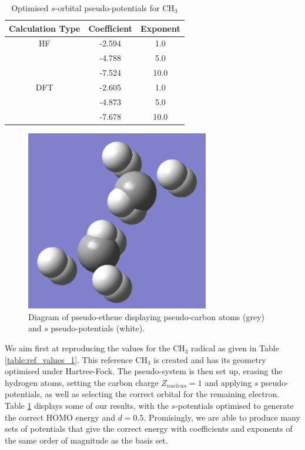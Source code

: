 \documentclass[journal=jctcce,manuscript=article]{achemso}
\begin{document}
\begin{table}[ht]
\caption{Optimised \(s\)-orbital pseudo-potentials for CH\(_{3}\)}
\begin{tabular}{c c c}
\hline\hline
Calculation Type & Coefficient & Exponent \\ [0.5ex]
\hline
HF & -2.594 & 1.0 \\
 & -4.788 & 5.0 \\
 & -7.524 & 10.0 \\
\hline
DFT & -2.605 & 1.0 \\
 & -4.873 & 5.0 \\
 & -7.678 & 10.0 \\
\hline
\end{tabular}
\label{table:ch3_s_potentials}
\end{table}

\begin{figure}
\includegraphics[width=8cm]{long_r_ethene_diagram.png}
\caption{Diagram of pseudo-ethene displaying pseudo-carbon atoms (grey) and \(s\) pseudo-potentials (white).}
\label{fig:long_r_ethene}
\end{figure}

We aim first at reproducing the values for the CH\(_{3}\) radical as given in Table \ref{table:ref_values_1}. This reference CH\(_{3}\) is created and has its geometry optimised under Hartree-Fock. The pseudo-system is then set up, erasing the hydrogen atoms, setting the carbon charge \(Z_{nucleus} = 1\) and applying \(s\) pseudo-potentials, as well as selecting the correct orbital for the remaining electron. Table \ref{table:ch3_s_potentials} displays some of our results, with the \(s\)-potentials optimised to generate the correct HOMO energy and \(d = 0.5\). Promisingly, we are able to produce many sets of potentials that give the correct energy with coefficients and exponents of the same order of magnitude as the basis set.
\end{document}
